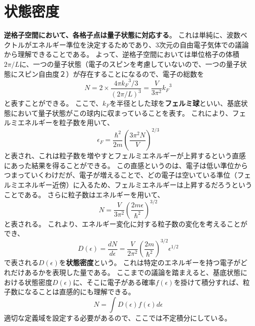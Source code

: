 \documentclass[a4paper]{jsreport}
\begin{document}
        \section{状態密度}
             \textbf{逆格子空間において、各格子点は量子状態に対応する}。
             これは単純に、波数ベクトルがエネルギー準位を決定するためであり、3次元の自由電子気体での議論から理解できることである。
             よって、逆格子空間においては単位格子の体積$2\pi/L$に、一つの量子状態（電子のスピンを考慮していないので、一つの量子状態にスピン自由度２）が存在することになるので、電子の総数を
             \begin{equation}
                N = 2 \times \frac{4\pi {k_F}^3 / 3}{(2\pi/L)^3} = \frac{V}{3\pi^2}{k_F}^3
             \end{equation}
             と表すことができる。
             ここで、$k_F$を半径とした球を\textbf{フェルミ球}といい、基底状態において量子状態がこの球内に収まっていることを表す。
             これにより、フェルミエネルギーを粒子数を用いて、
            \begin{equation}
                \epsilon_F = \frac{\hbar^2}{2m} \left(\frac{3\pi^2 N}{V}\right)^{2/3}
            \end{equation}
            と表され、これは粒子数を増やすとフェルミエネルギーが上昇するという直感にあった結果を得ることができる。
            この直感というのは、電子は低い準位からつまっていくわけだが、電子が増えることで、どの電子は空いている準位（フェルミエネルギー近傍）に入るため、フェルミエネルギーは上昇するだろうということである。
            さらに粒子数はエネルギーを用いて、
            \begin{equation}
                N = \frac{V}{3\pi^2} \left(\frac{2m\epsilon}{\hbar^2} \right) ^ {3/2}
            \end{equation}
            と表される。
            これより、エネルギー変化に対する粒子数の変化を考えることができ、
            \begin{equation}
                D(\epsilon) = \frac{dN}{d\epsilon} = \frac{V}{2\pi^2} \left(\frac{2m}{\hbar^2} \right) ^ {3/2} \epsilon^{1/2}
            \end{equation}
            で表される$D(\epsilon)$を\textbf{状態密度}という。
            これは特定のエネルギーを持つ電子がどれだけあるかを表現した量である。
            ここまでの議論を踏まえると、基底状態における状態密度$D(\epsilon)$に、そこに電子がある確率$f(\epsilon)$を掛けて積分すれば、粒子数になることは直感的にも理解できる。
            \begin{equation}
                N = \int D(\epsilon) f(\epsilon) d\epsilon
            \end{equation}
            適切な定義域を設定する必要があるので、ここでは不定積分にしている。
\end{document}
